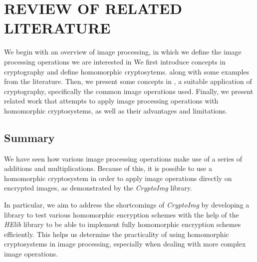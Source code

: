 \chapter{REVIEW OF RELATED LITERATURE}

We begin with an overview of image processing, in which we define the image processing operations we are interested in
We first introduce concepts in cryptography and define homomorphic cryptosytems. along with some examples from the literature. Then, we present some concepts in , a suitable application of cryptography, specifically the common image operations used. Finally, we present related work that attempts to apply image processing operations with homomorphic cryptosystems, as well as their advantages and limitations.







\section{Summary}
We have seen how various image processing operations make use of a series of additions and multiplications. Because of this, it is possible to use a homomorphic cryptosystem in order to apply image operations directly on encrypted images, as demonstrated by the \textit{CryptoImg} library.

In particular, we aim to address the shortcomings of \textit{CryptoImg} by developing a library to test various homomorphic encryption schemes with the help of the \textit{HElib} library to be able to implement fully homomorphic encryption schemes efficiently. This helps us determine the practicality of using homomorphic cryptosystems in image processing, especially when dealing with more complex image operations.
